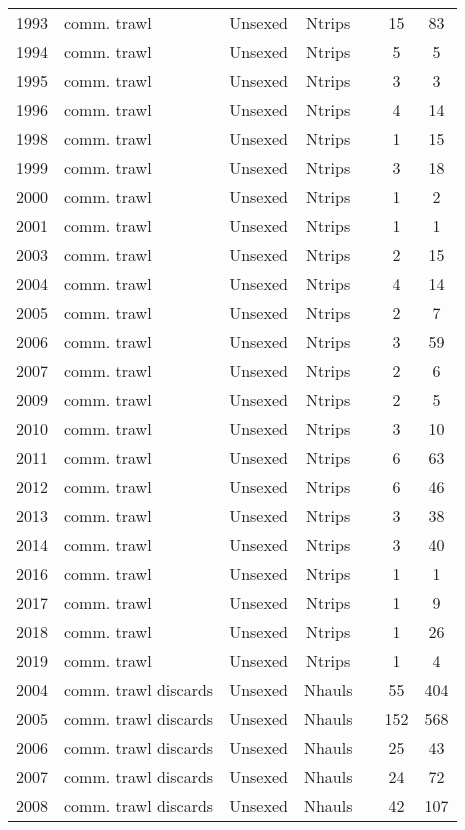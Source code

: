 \begin{longtable}[t]{c>{\centering\arraybackslash}p{3cm}ccccc}
1993 & comm. trawl & Unsexed & Ntrips &  & 15 & 83\\
1994 & comm. trawl & Unsexed & Ntrips &  & 5 & 5\\
1995 & comm. trawl & Unsexed & Ntrips &  & 3 & 3\\
1996 & comm. trawl & Unsexed & Ntrips &  & 4 & 14\\
1998 & comm. trawl & Unsexed & Ntrips &  & 1 & 15\\
1999 & comm. trawl & Unsexed & Ntrips &  & 3 & 18\\
2000 & comm. trawl & Unsexed & Ntrips &  & 1 & 2\\
2001 & comm. trawl & Unsexed & Ntrips &  & 1 & 1\\
2003 & comm. trawl & Unsexed & Ntrips &  & 2 & 15\\
2004 & comm. trawl & Unsexed & Ntrips &  & 4 & 14\\
2005 & comm. trawl & Unsexed & Ntrips &  & 2 & 7\\
2006 & comm. trawl & Unsexed & Ntrips &  & 3 & 59\\
2007 & comm. trawl & Unsexed & Ntrips &  & 2 & 6\\
2009 & comm. trawl & Unsexed & Ntrips &  & 2 & 5\\
2010 & comm. trawl & Unsexed & Ntrips &  & 3 & 10\\
2011 & comm. trawl & Unsexed & Ntrips &  & 6 & 63\\
2012 & comm. trawl & Unsexed & Ntrips &  & 6 & 46\\
2013 & comm. trawl & Unsexed & Ntrips &  & 3 & 38\\
2014 & comm. trawl & Unsexed & Ntrips &  & 3 & 40\\
2016 & comm. trawl & Unsexed & Ntrips &  & 1 & 1\\
2017 & comm. trawl & Unsexed & Ntrips &  & 1 & 9\\
2018 & comm. trawl & Unsexed & Ntrips &  & 1 & 26\\
2019 & comm. trawl & Unsexed & Ntrips &  & 1 & 4\\
2004 & comm. trawl discards & Unsexed & Nhauls &  & 55 & 404\\
2005 & comm. trawl discards & Unsexed & Nhauls &  & 152 & 568\\
2006 & comm. trawl discards & Unsexed & Nhauls &  & 25 & 43\\
2007 & comm. trawl discards & Unsexed & Nhauls &  & 24 & 72\\
2008 & comm. trawl discards & Unsexed & Nhauls &  & 42 & 107\\

\end{longtable}
